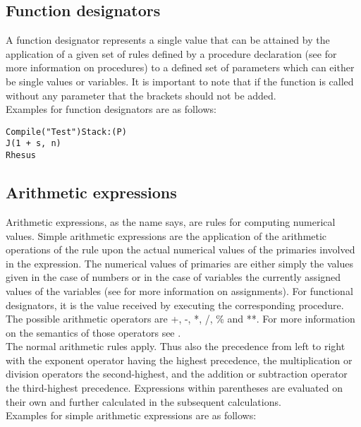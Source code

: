 \documentclass{article}
\begin{document}
\subsection{Function designators}
A function designator represents a single value that can be attained by the application of a given set of rules defined by a procedure declaration (see  for more information on procedures) to a defined set of parameters which can either be single values or variables. It is important to note that if the function is called without any parameter that the brackets should not be added.\\ 

Examples for function designators are as follows:\\

\begin{lstlisting}[language={[60]algol}]
Compile("Test")Stack:(P)
J(1 + s, n)
Rhesus
\end{lstlisting}

\subsection{Arithmetic expressions} \label{arithexp}
Arithmetic expressions, as the name says, are rules for computing numerical values. Simple arithmetic expressions are the application of the arithmetic operations of the rule upon the actual numerical values of the primaries involved in the expression. The numerical values of primaries are either simply the values given in the case of numbers or in the case of variables the currently assigned values of the variables (see  for more information on assignments). For functional designators, it is the value received by executing the corresponding procedure.\\
The possible arithmetic operators are +, -, *, /, \% and  **. For more information on the semantics of those operators see .\\
The normal arithmetic rules apply. Thus also the precedence from left to right with the exponent operator having the highest precedence, the multiplication or division operators the second-highest, and the addition or subtraction operator the third-highest precedence. Expressions within parentheses are evaluated on their own and further calculated in the subsequent calculations.\\

Examples for simple arithmetic expressions are as follows:\\
\end{document}
